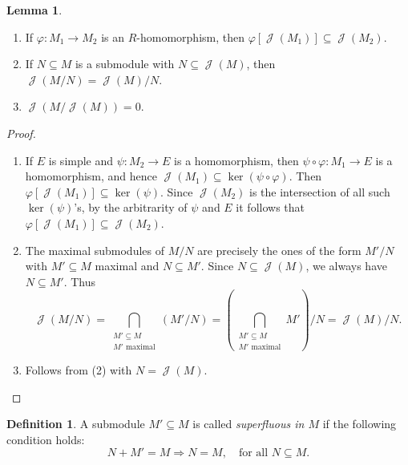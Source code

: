 \documentclass[12pt,a4paper]{report}
\theoremstyle{definition}
\newtheorem{lemma}[theorem]{Lemma}
\newtheorem{defn}[theorem]{Definition}
\theoremstyle{num.custom-title}
\DeclareMathOperator{\J}{\mathcal{J}}
\DeclareMathOperator{\sse}{\subseteq}
\renewcommand{\phi}{\varphi}
\begin{document}
\begin{lemma}\ 
\begin{enumerate}
\item If $\phi : M_1 \to M_2$ is an $R$-homomorphism, then $\phi[\J(M_1)] \sse \J(M_2)$.
\item If $N \sse M$ is a submodule with $N \sse \J(M)$, then $\J(M/N)=\J(M)/N$.
\item $\J(M/\J(M)) = 0$.
\end{enumerate}
\begin{proof}\ 
\begin{enumerate}
\item If $E$ is simple and $\psi : M_2 \to E$ is a homomorphism, then $\psi \circ \phi : M_1 \to E$ is a homomorphism, and hence $\J(M_1) \sse \ker(\psi \circ \phi)$. Then $\phi[\J(M_1)] \sse \ker(\psi)$. Since $\J(M_2)$ is the intersection of all such $\ker(\psi)$'s, by the arbitrarity of $\psi$ and $E$ it follows that $\phi[\J(M_1)] \sse \J(M_2)$.
\item The maximal submodules of $M/N$ are precisely the ones of the form $M'/N$ with $M' \sse M$ maximal and $N \sse M'$. Since $N \sse \J(M)$, we always have $N \sse M'$. Thus
\[
\J(M/N) = \bigcap_{\substack{M' \sse M \\ M' \text{ maximal}}} (M'/N) = \left( \bigcap_{\substack{M' \sse M \\ M' \text{ maximal}}} M' \right) /N = \J(M)/N. 
\]
\item Follows from (2) with $N=\J(M)$.
\end{enumerate}
\end{proof}
\end{lemma}

\begin{defn}
A submodule $M' \sse M$ is called \emph{superfluous in $M$} if the following condition holds:
\[
N+M' = M \Longrightarrow N=M, \quad \text{for all } N \sse M.
\]
\end{defn}
\end{document}
